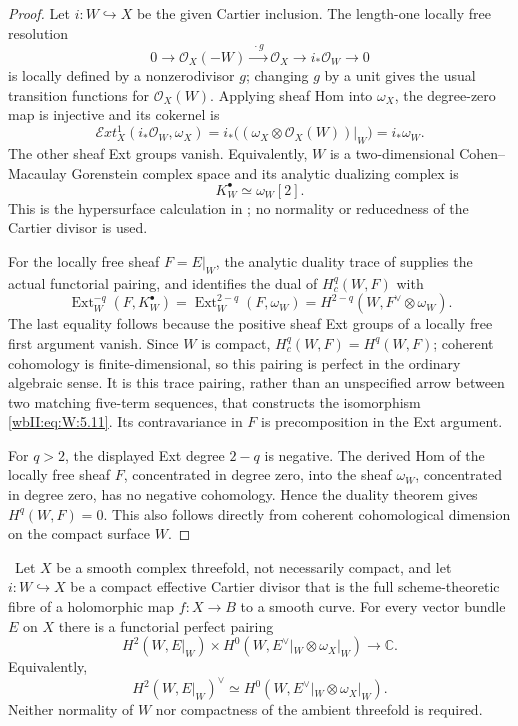 \begin{proof}
Let \(i:W\hookrightarrow X\) be the given Cartier inclusion.  The
length-one locally free resolution
\[
 0\longrightarrow\mathcal O_X(-W)
 \xrightarrow{\;\cdot g\;}\mathcal O_X
 \longrightarrow i_*\mathcal O_W\longrightarrow0
\]
is locally defined by a nonzerodivisor \(g\); changing \(g\) by a unit
gives the usual transition functions for \(\mathcal O_X(W)\).
Applying sheaf Hom into \(\omega_X\), the degree-zero map is
injective and its cokernel is
\[
 \mathcal E xt^1_X(i_*\mathcal O_W,\omega_X)
 =i_*\bigl((\omega_X\otimes\mathcal O_X(W))|_W\bigr)
 =i_*\omega_W.
\]
The other sheaf Ext groups vanish.  Equivalently, \(W\) is a
two-dimensional Cohen--Macaulay Gorenstein complex space and its
analytic dualizing complex is
\[
 K_W^\bullet\simeq\omega_W[2].
\]
This is the hypersurface calculation in
\cite[Proposition~2 and pp.~90--91]{RR70push}; no normality or
reducedness of the Cartier divisor is used.

For the locally free sheaf \(F=E|_W\), the analytic duality trace of
\cite[Theorem~2, pp.~82--83]{RR70push} supplies the actual
functorial pairing, and identifies the dual of \(H_c^q(W,F)\) with
\[
 \operatorname{Ext}^{-q}_W(F,K_W^\bullet)
 =\operatorname{Ext}^{2-q}_W(F,\omega_W)
 =H^{2-q}(W,F^\vee\otimes\omega_W).
\]
The last equality follows because the positive sheaf Ext groups
of a locally free first argument vanish.  Since \(W\) is compact,
\(H_c^q(W,F)=H^q(W,F)\); coherent cohomology is finite-dimensional,
so this pairing is perfect in the ordinary algebraic sense.
It is this trace pairing, rather than an unspecified arrow between
two matching five-term sequences, that constructs the isomorphism
\eqref{wbII:eq:W:5.11}.  Its contravariance in \(F\) is precomposition in the Ext
argument.

For \(q>2\), the displayed Ext degree \(2-q\) is negative.  The
derived Hom of the locally free sheaf \(F\), concentrated in degree
zero, into the sheaf \(\omega_W\), concentrated in degree zero, has
no negative cohomology.  Hence the duality theorem gives
\(H^q(W,F)=0\).  This also follows directly from coherent
cohomological dimension on the compact surface \(W\).
\end{proof}

\begin{proposition}
\label{wbII:prop:cartier-duality-absolute}
\ Let $X$ be a smooth complex threefold, not necessarily compact,
and let $i:W\hookrightarrow X$ be a compact effective Cartier divisor that
is the full scheme-theoretic fibre of a holomorphic map $f:X\to B$ to a
smooth curve.  For every vector bundle $E$ on $X$ there is a functorial
perfect pairing
\[
 H^2(W,E|_W)\times
 H^0(W,E^\vee|_W\otimes\omega_X|_W)\longrightarrow\mathbb C.
\]
Equivalently,
\[
 H^2(W,E|_W)^\vee\simeq
 H^0(W,E^\vee|_W\otimes\omega_X|_W).
\tag{W.12}\label{wbII:eq:W:5.15a}
\]
Neither normality of $W$ nor compactness of the ambient threefold is
required.
\end{proposition}

